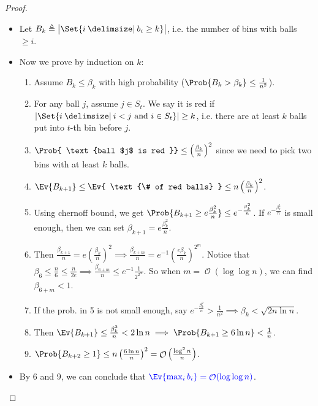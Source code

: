 \documentclass[a4paper]{article}
\DeclarePairedDelimiter{\abs}{\lvert}{\rvert}
\DeclareMathOperator{\Ord}{\mathcal{O}}
\providecommand\given{}
\newcommand*\SetSymbol[1][]{%
  \nonscript\:#1\vert
  \allowbreak
  \nonscript\:
\mathopen{}}
\renewcommand\given{\SetSymbol[\delimsize]}
\renewcommand\given{\SetSymbol[\delimsize]}
\theoremstyle{mystyle}
\begin{document}
\begin{proof} \mbox{}
  \begin{itemize}
    \item Let $B_k \triangleq \abs[\big ]{\Set{ i \given b_i \ge k }}$,
      i.e. the number of bins with balls $\ge i$.
    \item Now we prove by induction on $k$:
      \begin{enumerate}
        \item Assume $B_k \le \beta_k$ with high probability
          ($\Prob{B_k > \beta_k} \le \frac{1}{n^2}$).
        \item For any ball $j$, assume $j \in S_t$. We say it is red if
          $\abs{\Set{ i \given i < j \text{ and } i \in S_t}} \ge k$,
          i.e. there are at least $k$ balls put into $t$-th bin before $j$.
        \item $\Prob{ \text{ball $j$ is red }} \le \left(\frac{\beta_k}{n}\right)^2$
          since we need to pick two bins with at least $k$ balls.
        \item $\Ev{B_{k+1}} \le \Ev{ \text{\# of red balls} } \le
          n\left(\frac{\beta_k}{n}\right)^2$.
        \item Using chernoff bound, we get
          $\Prob{B_{k+1} \ge e\frac{\beta_k^2}{n}} \le e^{-\frac{\beta_k^2}{n}}$.
          If $e^{-\frac{\beta_k^2}{n}}$ is small enough, then we can set
          $\beta_{k+1} = e\frac{\beta_k^2}{n}$.
        \item Then $\frac{\beta_{k+1}}{n} = e\left(\frac{\beta_k}{n}\right)^2
          \implies \frac{\beta_{k+m}}{n} = e^{-1} \left(\frac{e\beta_k}{n}\right)^{2^m}$.
          Notice that $\beta_6 \le \frac{n}{6} \le \frac{n}{2e}
          \implies \frac{\beta_{6+m}}{n} \le e^{-1} \frac{1}{2^{2^m}}$.
          So when $m = \Ord(\log \log n)$, we can find $\beta_{6+m} < 1$.
        \item If the prob. in 5 is not small enough, say
          $e^{-\frac{\beta_k^2}{n}} > \frac{1}{n^2} \implies \beta_k < \sqrt{2n \ln n}$.
        \item Then $\Ev{B_{k+1}} \le \frac{\beta_k^2}{n} < 2 \ln n
          \implies \Prob{B_{k+1} \ge 6 \ln n} < \frac{1}{n}$.
        \item $\Prob{B_{k+2} \ge 1} \le n \left(\frac{6 \ln n}{n}\right)^2
          = \Ord\left(\frac{\log^2 n}{n}\right)$.
      \end{enumerate}
    \item By 6 and 9, we can conclude that 
      ${\color{blue} \Ev{ \max_i b_i } = \Ord(\log \log n)}$.
      \qedhere
  \end{itemize}
\end{proof}
\end{document}
